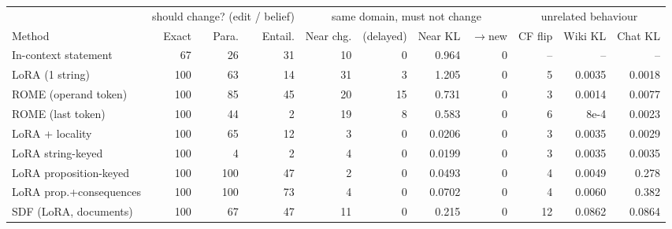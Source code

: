 \begin{tabular}{lrrrrrrrrrr}
\toprule
 & \multicolumn{3}{c}{should change? (edit / belief)} & \multicolumn{4}{c}{same domain, must not change} & \multicolumn{3}{c}{unrelated behaviour} \\
\cmidrule(lr){2-4}\cmidrule(lr){5-8}\cmidrule(lr){9-11}
Method & Exact & Para. & Entail. & Near chg. & (delayed) & Near KL & $\to$new & CF flip & Wiki KL & Chat KL \\
\midrule
In-context statement & 67 & 26 & 31 & 10 & 0 & 0.964 & 0 & -- & -- & -- \\
\addlinespace[2pt]
LoRA (1 string) & 100 & 63 & 14 & 31 & 3 & 1.205 & 0 & 5 & 0.0035 & 0.0018 \\
ROME (operand token) & 100 & 85 & 45 & 20 & 15 & 0.731 & 0 & 3 & 0.0014 & 0.0077 \\
ROME (last token) & 100 & 44 & 2 & 19 & 8 & 0.583 & 0 & 6 & 8e-4 & 0.0023 \\
\addlinespace[2pt]
LoRA + locality & 100 & 65 & 12 & 3 & 0 & 0.0206 & 0 & 3 & 0.0035 & 0.0029 \\
\addlinespace[2pt]
LoRA string-keyed & 100 & 4 & 2 & 4 & 0 & 0.0199 & 0 & 3 & 0.0035 & 0.0035 \\
\addlinespace[2pt]
LoRA proposition-keyed & 100 & 100 & 47 & 2 & 0 & 0.0493 & 0 & 4 & 0.0049 & 0.278 \\
\addlinespace[2pt]
LoRA prop.+consequences & 100 & 100 & 73 & 4 & 0 & 0.0702 & 0 & 4 & 0.0060 & 0.382 \\
\addlinespace[2pt]
SDF (LoRA, documents) & 100 & 67 & 47 & 11 & 0 & 0.215 & 0 & 12 & 0.0862 & 0.0864 \\
\bottomrule
\end{tabular}
